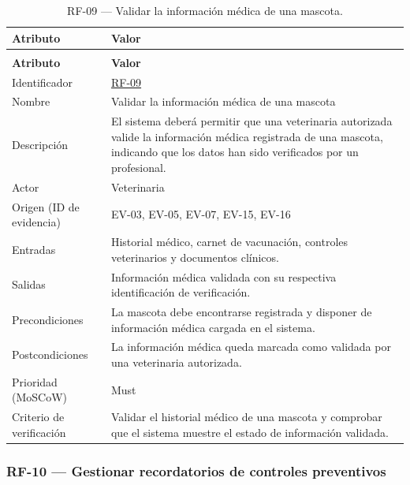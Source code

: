\documentclass[journal,onecolumn]{IEEEtran}
\makeatletter
\newenvironment{atributos}[2]{%
	\small
	\begin{longtable}{@{}>{\raggedright\arraybackslash}p{4.2cm} >{\raggedright\arraybackslash}p{11.2cm}@{}}
		\caption{#2}\label{tab:#1}\\
		\toprule
		\textbf{Atributo} & \textbf{Valor} \\
		\midrule
		\endfirsthead
		\multicolumn{2}{@{}l}{\small\itshape (continuación)}\\
		\toprule
		\textbf{Atributo} & \textbf{Valor} \\
		\midrule
		\endhead
		\bottomrule
		\endlastfoot
	}{%
	\end{longtable}
	\normalsize
}
\makeatother
\begin{document}
	\begin{atributos}{RF-09}{RF-09 --- Validar la información médica de una mascota.}
		Identificador & \hyperref[tab:RF-09]{RF-09} \\
		Nombre & Validar la información médica de una mascota \\
		Descripción & El sistema deberá permitir que una veterinaria autorizada valide la información médica registrada de una mascota, indicando que los datos han sido verificados por un profesional. \\
		Actor & Veterinaria \\
		Origen (ID de evidencia) & EV-03, EV-05, EV-07, EV-15, EV-16 \\
		Entradas & Historial médico, carnet de vacunación, controles veterinarios y documentos clínicos. \\
		Salidas & Información médica validada con su respectiva identificación de verificación. \\
		Precondiciones & La mascota debe encontrarse registrada y disponer de información médica cargada en el sistema. \\
		Postcondiciones & La información médica queda marcada como validada por una veterinaria autorizada. \\
		Prioridad (MoSCoW) & Must \\
		Criterio de verificación & Validar el historial médico de una mascota y comprobar que el sistema muestre el estado de información validada. \\
	\end{atributos}
	
	\subsubsection{RF-10 --- Gestionar recordatorios de controles preventivos}
	
\end{document}
